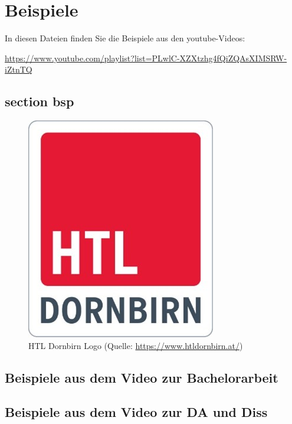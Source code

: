 \chapter{Beispiele}

In diesen Dateien finden Sie die Beispiele aus den youtube-Videos:

\url{https://www.youtube.com/playlist?list=PLwlC-XZXtzhg4fQiZQAsXIMSRW-iZtnTQ}

\section{section bsp}
\begin{figure}
	\centering
	\includegraphics[width=0.4\linewidth]{Bilder/HTL_Dornbirn_Logo}
	\caption{HTL Dornbirn Logo (Quelle: \url{https://www.htldornbirn.at/})}
	\label{fig:htldornbirnlogo}
\end{figure}


\section{Beispiele aus dem Video zur Bachelorarbeit}
\setAuthor{\pezze}

\newpage
\section{Beispiele aus dem Video zur DA und Diss}
\setAuthor{\schneider}



